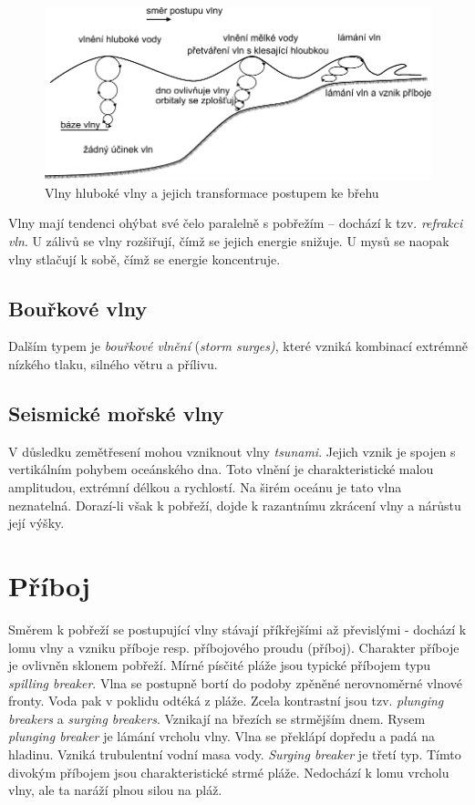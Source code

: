 \begin{figure}[h]
	\centering
	\includegraphics[width=0.8\linewidth]{obrazky/marine/vlny_transformace}
	\caption{Vlny hluboké vlny a jejich transformace postupem ke břehu}
	\label{fig:vlnytransformace}
\end{figure}

Vlny mají tendenci ohýbat své čelo paralelně s pobřežím -- dochází k tzv. \emph{refrakci vln}. U zálivů se vlny rozšiřují, čímž se jejich energie snižuje. U mysů se naopak vlny stlačují k sobě, čímž se energie koncentruje.
\subsection{Bouřkové vlny}
Dalším typem je \emph{bouřkové vlnění} (\textit{storm surges)}, které vzniká kombinací extrémně nízkého tlaku, silného větru a přílivu. 
 
\subsection{Seismické mořské vlny}
V důsledku zemětřesení mohou vzniknout vlny \emph{tsunami}. Jejich vznik je spojen s vertikálním pohybem oceánského dna. Toto vlnění je charakteristické malou amplitudou, extrémní délkou a rychlostí. Na širém oceánu je tato vlna neznatelná. Dorazí-li však k pobřeží, dojde k razantnímu zkrácení vlny a nárůstu její výšky. 

\section{Příboj}
Směrem k pobřeží se postupující vlny stávají příkřejšími až převislými - dochází k lomu vlny a vzniku příboje resp. příbojového proudu (příboj). Charakter příboje je ovlivněn sklonem pobřeží. Mírné písčité pláže jsou typické příbojem typu \textit{spilling breaker}. Vlna se postupně bortí do podoby zpěněné nerovnoměrné vlnové fronty. Voda pak v poklidu odtéká z pláže. Zcela kontrastní jsou tzv. \textit{plunging breakers} a \textit{surging breakers}. Vznikají na březích se strmějším dnem. Rysem \textit{plunging breaker} je lámání vrcholu vlny. Vlna se překlápí dopředu a padá na hladinu. Vzniká trubulentní vodní masa vody. \textit{Surging breaker} je třetí typ. Tímto divokým příbojem jsou charakteristické strmé pláže. Nedochází k lomu vrcholu vlny, ale ta naráží plnou silou na pláž.

